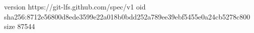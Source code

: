 version https://git-lfs.github.com/spec/v1
oid sha256:8712e56800d8ede3599e22a018b0bdd252a789ee39ebf5455e0a24cb5278c800
size 87544
